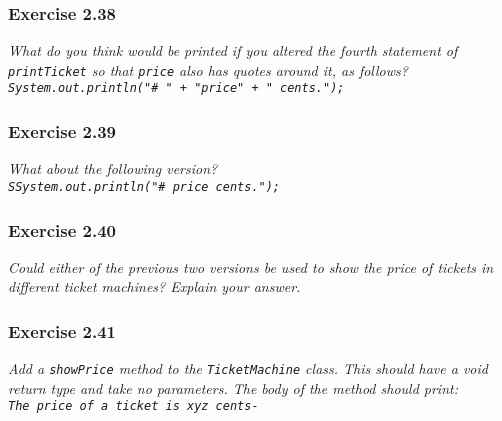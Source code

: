 \subsubsection*{Exercise 2.38}
\textit{What do you think would be printed if you altered the fourth statement 
of \verb?printTicket? so that \verb?price? also has quotes around it, as 
follows? \\
\verb?System.out.println("# " + "price" + " cents.");?}

\subsubsection*{Exercise 2.39}
\textit{What about the following version? \\
\verb?SSystem.out.println("# price cents.");?}

\subsubsection*{Exercise 2.40}
\textit{Could either of the previous two versions be used to show the price of 
tickets in different ticket machines? Explain your answer. }

\subsubsection*{Exercise 2.41}
\textit{Add a \verb?showPrice? method to the \verb?TicketMachine? class. This 
should have a void return type and take no parameters. The body of the method 
should print: \\
\verb?The price of a ticket is xyz cents- ?}


